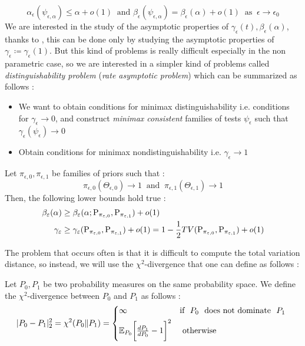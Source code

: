 \begin{equation*}
    \alpha_{\epsilon}(\psi_{\epsilon,\alpha}) \leq \alpha + o(1) \ \text{ and } \beta_\epsilon(\psi_{\epsilon,\alpha}) = \beta_\epsilon(\alpha) + o(1) \ \text{ as } \ \epsilon \rightarrow \epsilon_0
\end{equation*}
We are interested in the study of the asymptotic properties of $\gamma_\epsilon(t), \beta_\epsilon(\alpha)$, thanks to , this can be done only by studying the asymptotic properties of $\gamma_\epsilon \coloneqq \gamma_\epsilon(1)$. But this kind of problems is really difficult especially in the non parametric case, so we are interested 
in a simpler kind of problems called \textit{distinguishability problem} (\textit{rate asymptotic problem}) which can be summarized as follows : 
\begin{itemize}
    \item We want to obtain conditions for minimax distinguishability i.e. conditions for $\gamma_\epsilon \rightarrow 0$, and construct \textit{minimax consistent} families of tests $\psi_\epsilon$ such that $\gamma_\epsilon(\psi_\epsilon) \rightarrow 0$
    \item Obtain conditions for minimax nondistinguishability i.e. $\gamma_\epsilon \rightarrow 1$
\end{itemize}
\begin{prop}
    Let $\pi_{\epsilon,0},\pi_{\epsilon,1}$ be families of priors such that : 
    \begin{equation*}
        \pi_{\epsilon,0}(\Theta_{\epsilon,0}) \rightarrow 1 \ \text{ and } \ \pi_{\epsilon,1}(\Theta_{\epsilon,1}) \rightarrow 1 
    \end{equation*}
    Then, the following lower bounds hold true : 
    \begin{align*}
        \beta_\varepsilon(\alpha) &\geq \beta_\varepsilon(\alpha; \text{P}_{\pi_{\varepsilon,0}},\text{P}_{\pi_{\varepsilon,1}}) + o(1) \\
        \gamma_\varepsilon &\geq \gamma_\varepsilon(\text{P}_{\pi_{\varepsilon,0}},\text{P}_{\pi_{\varepsilon,1}}) + o(1) = 1 - \frac{1}{2}TV(\text{P}_{\pi_{\varepsilon,0}},\text{P}_{\pi_{\varepsilon,1}}) + o(1) 
    \end{align*}
\end{prop}
The problem that occurs often is that it is difficult to compute the total variation distance, so instead, we will use the $\chi^2$-divergence that one can define as follows : 
\begin{definition}
    Let $P_0,P_1$ be two probability measures on the same probability space. We define the $\chi^2$-divergence between $P_0$ and $P_1$ as follows : 
    \begin{equation}\label{chi2div}
        |P_0-P_1|_{2}^2 = \chi^2(P_0\Vert P_1) = \begin{cases*}
            \infty &\text{if} \ $P_0 \ \text{ does not dominate } \ P_1$ \\ 
            \E_{P_0} \bigg[\frac{dP_1}{dP_0}-1\bigg]^2 &\text{ otherwise }
        \end{cases*}
    \end{equation}
\end{definition}
